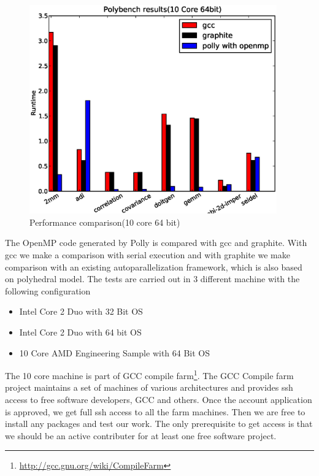 \begin{figure}
\begin{center}
  \includegraphics[height=9cm]{images/10core64bit.eps}
  \caption{Performance comparison(10 core 64 bit)}
  \label{fig:10core}
\end{center}
\end{figure}

The OpenMP code generated by Polly is compared with gcc and graphite\cite{TRIFUNOVIC:2010}. With gcc
we make a comparison with serial execution and with graphite we make comparison
with an existing autoparallelization framework, which is also based on polyhedral
model. 
The tests are carried out in 3 different machine with the following configuration

\begin{itemize}
\item Intel Core 2 Duo with 32 Bit OS
\item Intel Core 2 Duo with 64 bit OS
\item 10 Core AMD Engineering Sample with 64 Bit OS
\end{itemize}
The 10 core machine is part of GCC compile farm\footnote{\url{http://gcc.gnu.org/wiki/CompileFarm}}. The GCC Compile farm project maintains
a set of machines of various architectures and provides ssh access to free software developers, GCC and others.
Once the account application  is approved, we get full ssh access to all the farm machines. Then we
are free to install any packages and test our work. The only prerequisite to get access is that
we should be an active contributer for at least one free software project.

